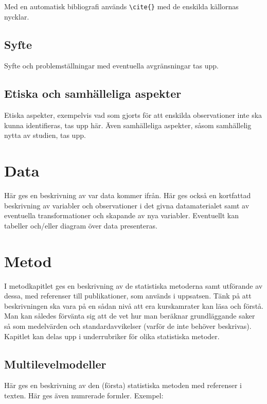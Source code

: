 \documentclass[10pt,swedish]{book}
\begin{document}
Med en automatisk bibliografi används \verb=\cite{}= med de enskilda källornas nycklar.

\section{Syfte}

Syfte och problemställningar med eventuella avgränsningar tas upp.

\section{Etiska och samhälleliga aspekter}

Etiska aspekter, exempelvis vad som gjorts för att enskilda observationer
inte ska kunna identifieras, tas upp här. Även samhälleliga aspekter,
såsom samhällelig nytta av studien, tas upp.

\clearpage{}

\chapter{Data}

Här ges en beskrivning av var data kommer ifrån. Här ges också en
kortfattad beskrivning av variabler och observationer i det givna
datamaterialet samt av eventuella transformationer och skapande av
nya variabler. Eventuellt kan tabeller och/eller diagram över data
presenteras. 

\clearpage{}

\chapter{Metod}

I metodkapitlet ges en beskrivning av de statistiska metoderna samt
utförande av dessa, med referenser till publikationer, som används
i uppsatsen. Tänk på att beskrivningen ska vara på en sådan nivå att
era kurskamrater kan läsa och förstå. Man kan således förvänta sig
att de vet hur man beräknar grundläggande saker så som medelvärden
och standardavvikelser (varför de inte behöver beskrivas). Kapitlet
kan delas upp i underrubriker för olika statistiska metoder.

\section{Multilevelmodeller}

Här ges en beskrivning av den (första) statistiska metoden med referenser
i texten. Här ges även numrerade formler. Exempel:
\end{document}
